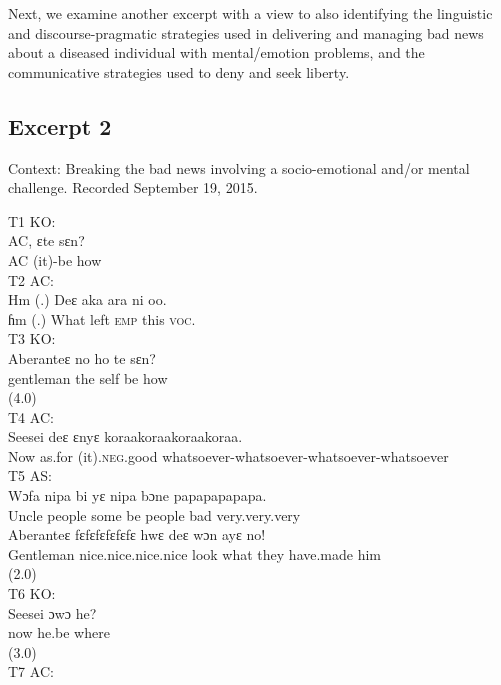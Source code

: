 \documentclass[output=paper,colorlinks,citecolor=brown]{langscibook}
\begin{document}
Next, we examine another excerpt with a view to also identifying the linguistic and discourse-pragmatic strategies used in delivering and managing bad news about a diseased individual with mental/emotion problems, and the communicative strategies used to deny and seek liberty.

\subsection{Excerpt 2}\label{sec:obeng:4.2}
Context: Breaking the bad news involving a socio-emotional and/or mental challenge. Recorded September 19, 2015.

\ea T1 KO:\\\label{ex:obeng:30}
    \gll    AC, ɛte sɛn?\\
            AC (it)-be how \\
\ex T2 AC:\\\label{ex:obeng:31}
    \gll    Hm (.) Deɛ aka ara ni oo. \\
            ɦm (.) What left \textsc{emp} this \textsc{voc}.\\
\ex T3 KO:\\\label{ex:obeng:32}
    \gll    Aberanteɛ no ho te sɛn? \\
            gentleman the self be how\\
            (4.0)\\
\ex T4 AC:\\\label{ex:obeng:33}
    \gll    Seesei deɛ ɛnyɛ koraakoraakoraakoraa. \\
            Now as.for (it).\textsc{neg}.good whatsoever-whatsoever-whatsoever-whatsoever\\
\ex
    T5 AS:\\\label{ex:obeng:34}
    \ea
    \gll    Wɔfa nipa bi yɛ nipa bɔne papapapapapa. \\
            Uncle people some be people bad very.very.very \\
    \ex
    \gll    Aberanteɛ fɛfɛfɛfɛfɛfɛ hwɛ deɛ wɔn ayɛ no! \\
            Gentleman nice.nice.nice.nice look what they have.made him \\
            (2.0)\\
    \z
\ex T6 KO:\\\label{ex:obeng:35}
    \gll    Seesei ɔwɔ he? \\
            now he.be where \\
            (3.0)\\
\ex T7 AC:\\\label{ex:obeng:36}
\end{document}
